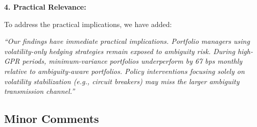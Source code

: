 \documentclass[12pt]{article}
\begin{document}
\begin{enumerate}
\begin{responsebox}
    \textbf{4. Practical Relevance:}
    
    To address the practical implications, we have added:

    \textit{``Our findings have immediate practical implications. Portfolio managers using volatility-only hedging strategies remain exposed to ambiguity risk. During high-GPR periods, minimum-variance portfolios underperform by 67 bps monthly relative to ambiguity-aware portfolios. Policy interventions focusing solely on volatility stabilization (e.g., circuit breakers) may miss the larger ambiguity transmission channel.''}
    \end{responsebox}

\end{enumerate}

\subsection*{Minor Comments}
\end{document}
